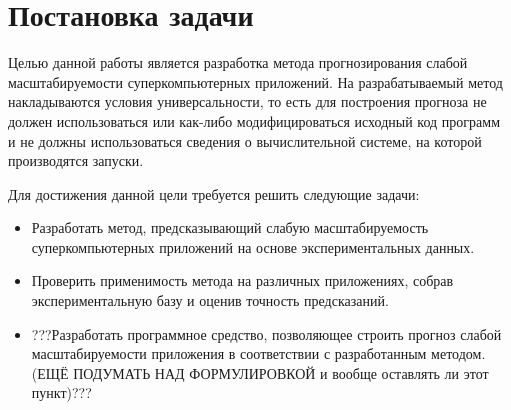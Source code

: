 \section{Постановка задачи}
	Целью данной работы является разработка метода прогнозирования слабой масштабируемости суперкомпьютерных приложений. На разрабатываемый метод накладываются условия универсальности, то есть для построения прогноза не должен использоваться или как-либо модифицироваться исходный код программ и не должны использоваться сведения о вычислительной системе, на которой производятся запуски.

	Для достижения данной цели требуется решить следующие задачи:
	\begin{itemize}
		\item Разработать метод, предсказывающий слабую масштабируемость суперкомпьютерных приложений на основе экспериментальных данных.
		\item Проверить применимость метода на различных приложениях, собрав экспериментальную базу и оценив точность предсказаний.
		\item ???Разработать программное средство, позволяющее строить прогноз слабой масштабируемости приложения в соответствии с разработанным методом.(ЕЩЁ ПОДУМАТЬ НАД ФОРМУЛИРОВКОЙ и вообще оставлять ли этот пункт)???
	\end{itemize}


\clearpage
